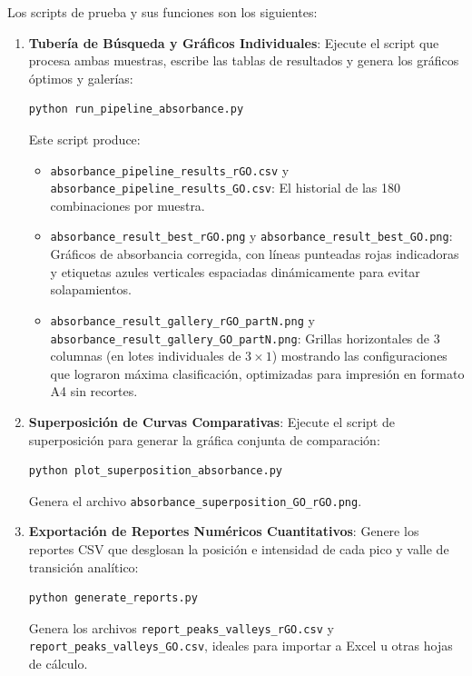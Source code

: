 \documentclass[a4paper,11pt]{article}
\begin{document}
Los scripts de prueba y sus funciones son los siguientes:

\begin{enumerate}
    \item \textbf{Tubería de Búsqueda y Gráficos Individuales}:
    Ejecute el script que procesa ambas muestras, escribe las tablas de resultados y genera los gráficos óptimos y galerías:
    \begin{lstlisting}[language=bash]
    python run_pipeline_absorbance.py
    \end{lstlisting}
    Este script produce:
    \begin{itemize}
        \item \texttt{absorbance\_pipeline\_results\_rGO.csv} y \texttt{absorbance\_pipeline\_results\_GO.csv}: El historial de las 180 combinaciones por muestra.
        \item \texttt{absorbance\_result\_best\_rGO.png} y \texttt{absorbance\_result\_best\_GO.png}: Gráficos de absorbancia corregida, con líneas punteadas rojas indicadoras y etiquetas azules verticales espaciadas dinámicamente para evitar solapamientos.
        \item \texttt{absorbance\_result\_gallery\_rGO\_partN.png} y \texttt{absorbance\_result\_gallery\_GO\_partN.png}: Grillas horizontales de 3 columnas (en lotes individuales de $3 \times 1$) mostrando las configuraciones que lograron máxima clasificación, optimizadas para impresión en formato A4 sin recortes.
    \end{itemize}

    \item \textbf{Superposición de Curvas Comparativas}:
    Ejecute el script de superposición para generar la gráfica conjunta de comparación:
    \begin{lstlisting}[language=bash]
    python plot_superposition_absorbance.py
    \end{lstlisting}
    Genera el archivo \texttt{absorbance\_superposition\_GO\_rGO.png}.

    \item \textbf{Exportación de Reportes Numéricos Cuantitativos}:
    Genere los reportes CSV que desglosan la posición e intensidad de cada pico y valle de transición analítico:
    \begin{lstlisting}[language=bash]
    python generate_reports.py
    \end{lstlisting}
    Genera los archivos \texttt{report\_peaks\_valleys\_rGO.csv} y \texttt{report\_peaks\_valleys\_GO.csv}, ideales para importar a Excel u otras hojas de cálculo.
\end{enumerate}
\end{document}

